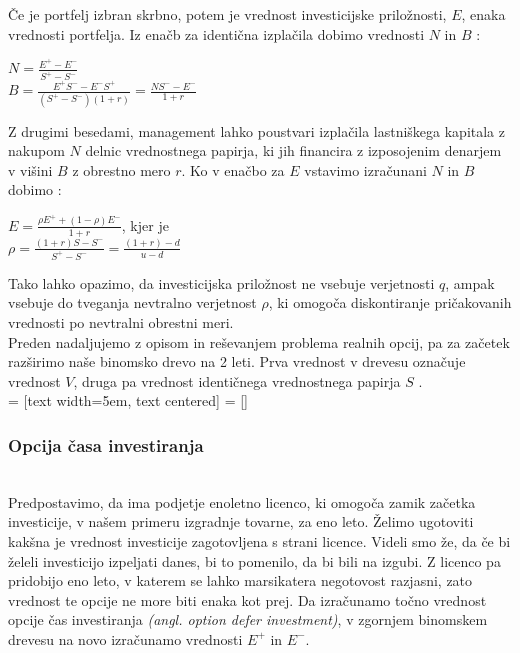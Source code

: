 Če je portfelj izbran skrbno, potem je vrednost investicijske priložnosti, $E$, enaka vrednosti portfelja. Iz enačb za identična izplačila dobimo vrednosti $N$ in $B$ \cite[str. 156]{Trigeorgis}:
\begin{center}
$N = \tfrac{E^+ - E^-}{S^+ - S^-}$\\[0,5 cm]
$B = \tfrac{E^+S^- - E^-S^+}{(S^+ - S^-)(1+r)} = \tfrac{NS^- - E^-}{1+r}$\\
\end{center}
Z drugimi besedami, management lahko poustvari izplačila lastniškega kapitala z nakupom $N$ delnic vrednostnega papirja, ki jih financira z izposojenim denarjem v višini $B$ z obrestno mero $r$. Ko v enačbo za $E$ vstavimo izračunani $N$ in $B$ dobimo \cite[str. 156, 157]{Trigeorgis}:
\begin{center}
$E = \tfrac{\rho E^+ + (1-\rho)E^-}{1+r}$, kjer je \\[0,5 cm]
$\rho = \tfrac{(1+r)S - S^-}{S^+ - S^-} = \tfrac{(1+r)-d}{u-d}$
\end{center}
Tako lahko opazimo, da investicijska priložnost ne vsebuje verjetnosti $q$, ampak vsebuje do tveganja nevtralno verjetnost $\rho$, ki omogoča diskontiranje pričakovanih vrednosti po nevtralni obrestni meri. \\

Preden nadaljujemo z opisom in reševanjem problema realnih opcij, pa za začetek razširimo naše binomsko drevo na 2 leti. Prva vrednost v drevesu označuje vrednost $V$, druga pa vrednost identičnega vrednostnega papirja $S$ \cite[str. 158]{Trigeorgis}. \\[0,5 cm]

 = [text width=5em, text centered]
 = []

\subsubsection{Opcija časa investiranja}
\cite[str. 158, 161]{Trigeorgis}\\
Predpostavimo, da ima podjetje enoletno licenco, ki omogoča zamik začetka investicije, v našem primeru izgradnje tovarne, za eno leto. Želimo ugotoviti kakšna je vrednost investicije zagotovljena s strani licence. Videli smo že, da če bi želeli investicijo izpeljati danes, bi to pomenilo, da bi bili na izgubi. Z licenco pa pridobijo eno leto, v katerem se lahko marsikatera negotovost razjasni, zato vrednost te opcije ne more biti enaka kot prej. Da izračunamo točno vrednost opcije čas investiranja \textit{(angl. option defer investment)}, v zgornjem binomskem drevesu na novo izračunamo vrednosti $E^+$ in $E^-$. 


